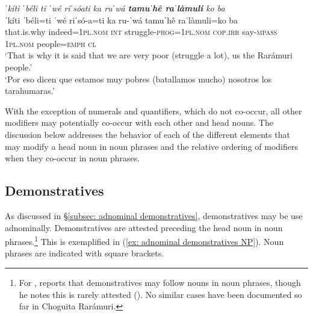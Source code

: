 \ea\label{ex: noun plus pronoun adposition}

\textit{ˈkíti ˈbéli ti ˈwé riˈsóati ka ruˈwá \textbf{tamuˈhê raˈlàmuli} ko ba}\\
\gll    ˈkíti ˈbéli=ti ˈwé riˈsó-a=ti ka ru-ˈwá tamuˈhê raˈlàmuli=ko ba\\
        that.is.why indeed=\textsc{1pl.nom} \textsc{int} struggle\textsc{-prog=1pl.nom} \textsc{cop.irr} say-\textsc{mpass} \textsc{1pl.nom} people\textsc{=emph} \textsc{cl}\\
\glt    `That is why it is said that we are very poor (struggle a lot), us the Rarámuri people.'\\
\glt    `Por eso dicen que estamos muy pobres (batallamos mucho) nosotros los tarahumaras.’ \\

\z

With the exception of numerals and quantifiers, which do not co-occur, all other modifiers may potentially co-occur with each other and head nouns. The discussion below addresses the behavior of each of the different elements that may modify a head noun in noun phrases and the relative ordering of modifiers when they co-occur in noun phrases.

\subsection{Demonstratives}
\label{subsec: demonstratives in noun phrases}

As discussed in §\ref{subsec: adnominal demonstratives}, demonstratives may be use adnominally. Demonstratives are attested preceding the head noun in noun phrases.\footnote{For , \citet{miller1996guarijio} reports that demonstratives may follow nouns in noun phrases, though he notes this is rarely attested (\citeyear[235]{miller1996guarijio}). No similar cases have been documented so far in Choguita Rarámuri.} This is exemplified in (\ref{ex: adnominal demonstratives NP}). Noun phrases are indicated with square brackets.

\ea\label{ex: adnominal demonstratives NP}

